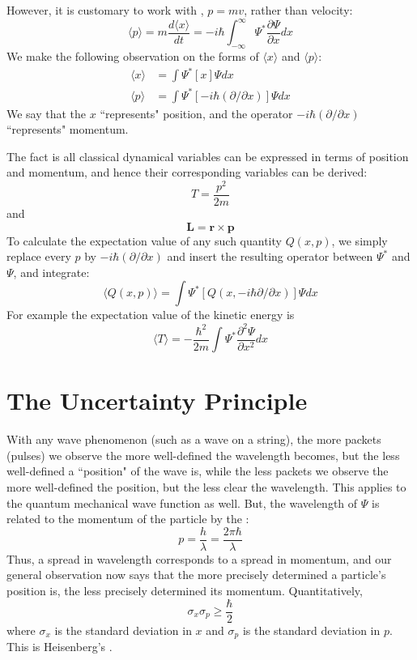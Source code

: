 \documentclass[12pt, a4paper, oneside, openright, titlepage]{book}
\begin{document}
However, it is customary to work with , $p = mv$, rather than velocity: \begin{equation*}
    \boxed{\langle p\rangle = m\frac{d\langle x\rangle}{dt} =  -i\hbar\int_{-\infty}^{\infty}\Psi^*\frac{\partial \Psi}{\partial x}dx}
\end{equation*}
We make the following observation on the forms of $\langle x\rangle$ and $\langle p\rangle$: \begin{align*}
    \langle x\rangle &= \int \Psi^*[x]\Psi dx \\
    \langle p\rangle &= \int\Psi^*[-i\hbar(\partial/\partial x)]\Psi dx
\end{align*}
We say that the  $x$ ``represents" position, and the operator $-i\hbar(\partial/\partial x)$ ``represents" momentum.

The fact is all classical dynamical variables can be expressed in terms of position and momentum, and hence their corresponding variables can be derived: $$T = \frac{p^2}{2m}$$ and $$\mathbf{L} = \mathbf{r} \times \mathbf{p}$$
To calculate the expectation value of any such quantity $Q(x,p)$, we simply replace every $p$ by $-i\hbar(\partial/\partial x)$ and insert the resulting operator between $\Psi^*$ and $\Psi$, and integrate: \begin{equation*}
    \boxed{\langle Q(x,p)\rangle = \int \Psi^*\left[Q(x,-i\hbar \partial/\partial x)\right]\Psi dx}
\end{equation*}
For example the expectation value of the kinetic energy is $$\langle T\rangle = -\frac{\hbar^2}{2m}\int\Psi^*\frac{\partial^2\Psi}{\partial x^2}dx$$


\section{The Uncertainty Principle}

With any wave phenomenon (such as a wave on a string), the more packets (pulses) we observe the more well-defined the wavelength becomes, but the less well-defined a ``position" of the wave is, while the less packets we observe the more well-defined the position, but the less clear the wavelength. This applies to the quantum mechanical wave function as well. But, the wavelength of $\Psi$ is related to the momentum of the particle by the : $$\boxed{p = \frac{h}{\lambda} = \frac{2\pi\hbar}{\lambda}}$$ Thus, a spread in wavelength corresponds to a spread in momentum, and our general observation now says that the more precisely determined a particle's position is, the less precisely determined its momentum. Quantitatively, $$\boxed{\sigma_x\sigma_p \geq \frac{\hbar}{2}}$$ where $\sigma_x$ is the standard deviation in $x$ and $\sigma_p$ is the standard deviation in $p$. This is Heisenberg's .
\end{document}
